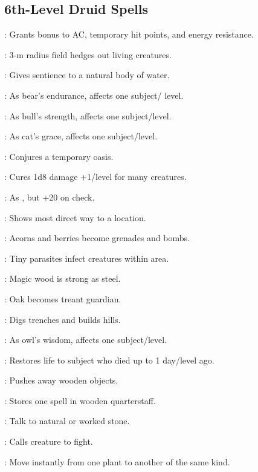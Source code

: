 \subsection{6th-Level Druid Spells}

: Grants bonus to AC, temporary hit points, and energy resistance.

: 3-m radius field hedges out living creatures.

: Gives sentience to a natural body of water.

: As bear's endurance, affects one subject/ level.

: As bull's strength, affects one subject/level.

: As cat's grace, affects one subject/level.

: Conjures a temporary oasis.

: Cures 1d8 damage +1/level for many creatures.

: As , but +20 on check.

: Shows most direct way to a location.

: Acorns and berries become grenades and bombs.

: Tiny parasites infect creatures within area.

: Magic wood is strong as steel.

: Oak becomes treant guardian.

: Digs trenches and builds hills.

: As owl's wisdom, affects one subject/level.

: Restores life to subject who died up to 1 day/level ago.

: Pushes away wooden objects.

: Stores one spell in wooden quarterstaff.

: Talk to natural or worked stone.

: Calls creature to fight.

: Move instantly from one plant to another of the same kind.

